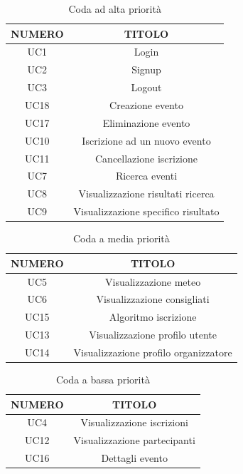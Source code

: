 \begin{table}
\begin{center}
\begin{tabular}{ |c|c|}
 \hline
 \textbf{NUMERO}& \textbf{TITOLO} \\ \hline
 UC1& Login\\ \hline
 UC2& Signup\\ \hline
 UC3& Logout\\ \hline
 UC18& Creazione evento\\ \hline
 UC17& Eliminazione evento\\ \hline
 UC10 & Iscrizione ad un nuovo evento\\ \hline
 UC11 & Cancellazione iscrizione\\ \hline
 UC7 & Ricerca eventi \\ \hline
 UC8 & Visualizzazione risultati ricerca \\ \hline
 UC9 & Visualizzazione specifico risultato \\ \hline
\end{tabular}
  \caption{Coda ad alta priorità}
  \label{tab: alta-priorità}
\end{center}
\end{table}

\begin{table}
\begin{center}
\begin{tabular}{ |c|c|}
 \hline
 \textbf{NUMERO}& \textbf{TITOLO} \\ \hline
 UC5& Visualizzazione meteo\\ \hline
 UC6& Visualizzazione consigliati\\ \hline
 UC15&Algoritmo iscrizione\\ \hline
 UC13&Visualizzazione profilo utente\\ \hline
 UC14&Visualizzazione profilo organizzatore\\ \hline
\end{tabular}
  \caption{Coda a media priorità}
  \label{tab: media-priorità}
\end{center}
\end{table}

\begin{table}
\begin{center}
\begin{tabular}{ |c|c|}
 \hline
 \textbf{NUMERO}& \textbf{TITOLO} \\ \hline
 UC4& Visualizzazione iscrizioni\\ \hline
 UC12& Visualizzazione partecipanti\\ \hline
 UC16& Dettagli evento\\ \hline
\end{tabular}
  \caption{Coda a bassa priorità}
  \label{tab: bassa-priorità}
\end{center}
\end{table}

